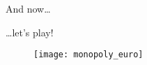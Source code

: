 \begin{frame}{And now\dots}
  \begin{center}
    \Huge \dots let's play!
  \end{center}
  
  \begin{figure}[h]
   \centering
   \texttt{[image: monopoly\_euro]}
  \end{figure}


\end{frame}
